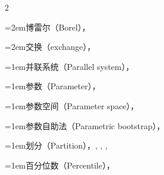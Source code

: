 \begin{multicols}{2}
\par\noindent\hangindent=2em\hspace*{1em}\label{idx:747}博雷尔（Borel），\hyperref[sec:4.9.3]{\pageref*{sec:4.9.3}}\par
\par\noindent\hangindent=2em\hspace*{1em}\label{idx:748}交换（exchange），\hyperref[sec:4.9.1]{\pageref*{sec:4.9.1}}\par
\par\addvspace{2pt}
\par\noindent\hangindent=1em\hspace*{0em}\label{idx:749}并联系统（Parallel system），\hyperref[exercise:4.55]{\pageref*{exercise:4.55}}\par
\par\addvspace{2pt}
\par\noindent\hangindent=1em\hspace*{0em}\label{idx:750}参数（Parameter），\hyperref[ex:2.1.1]{\pageref*{ex:2.1.1}}\par
\par\addvspace{2pt}
\par\noindent\hangindent=1em\hspace*{0em}\label{idx:751}参数空间（Parameter space），\hyperref[idxocc:751:313]{\pageref*{idxocc:751:313}}\par
\par\addvspace{2pt}
\par\noindent\hangindent=1em\hspace*{0em}\label{idx:752}参数自助法（Parametric bootstrap），\hyperref[ex:5.6.6]{\pageref*{ex:5.6.6}}\par
\par\addvspace{2pt}
\par\noindent\hangindent=1em\hspace*{0em}\label{idx:753}划分（Partition），\hyperref[def:1.1.6]{\pageref*{def:1.1.6}}, \hyperref[thm:1.3.5]{\pageref*{thm:1.3.5}}, \hyperref[idxocc:753:252]{\pageref*{idxocc:753:252}}, \hyperref[idxocc:753:259]{\pageref*{idxocc:753:259}}\par
\par\addvspace{2pt}
\par\noindent\hangindent=1em\hspace*{0em}\label{idx:754}百分位数（Percentile），\hyperref[idxocc:754:216]{\pageref*{idxocc:754:216}}\par

\end{multicols}
